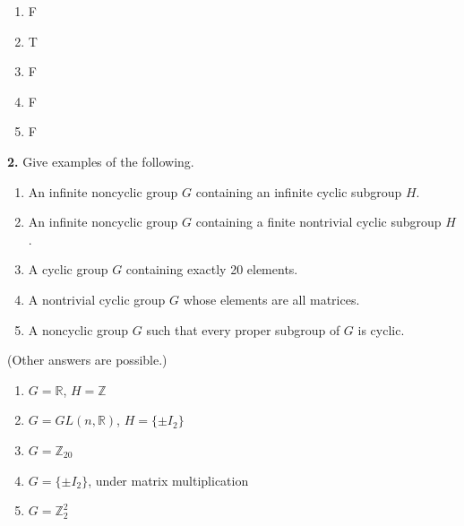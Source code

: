 \documentclass[10pt,]{book}
\theoremstyle{plain}
\theoremstyle{definition}
\theoremstyle{definition}
\theoremstyle{definition}
\theoremstyle{definition}
\numberwithin{equation}{section}
\def\Z{\mathbb{Z}}
\def\R{\mathbb{R}}
\begin{document}
\par\smallskip
\leavevmode%
\begin{multicols}{5}
\begin{enumerate}[label=(\alph*)]
\item\hypertarget{li-268}{}
          F
\item\hypertarget{li-269}{}
          T
\item\hypertarget{li-270}{}
          F
\item\hypertarget{li-271}{}
          F
\item\hypertarget{li-272}{}
          F
\end{enumerate}
\end{multicols}
\par\smallskip
\noindent\textbf{2.}\quad{}
        Give examples of the following.
        \leavevmode%
\begin{enumerate}[label=(\alph*)]
\item\hypertarget{li-273}{}
              An infinite noncyclic group \(G\) containing an infinite cyclic subgroup \(H\).
\item\hypertarget{li-274}{}
              An infinite noncyclic group \(G\) containing a finite nontrivial cyclic subgroup \(H\).
\item\hypertarget{li-275}{}
              A cyclic group \(G\) containing exactly 20 elements.
\item\hypertarget{li-276}{}
              A nontrivial cyclic group \(G\) whose elements are all matrices.
\item\hypertarget{li-277}{}
              A noncyclic group \(G\) such that every proper subgroup of \(G\) is cyclic.
\end{enumerate}

\par\smallskip

      (Other answers are possible.)
      \leavevmode%
\begin{enumerate}[label=(\alph*)]
\item\hypertarget{li-278}{}
            \(G=\R\), \(H=\Z\)
\item\hypertarget{li-279}{}
            \(G=GL(n,\R)\), \(H=\{\pm I_2\}\)
\item\hypertarget{li-280}{}
            \(G=\Z_{20}\)
\item\hypertarget{li-281}{}
            \(G=\{\pm I_2\}\), under matrix multiplication
\item\hypertarget{li-282}{}
            \(G=\Z_2^2\)
\end{enumerate}
\end{document}
